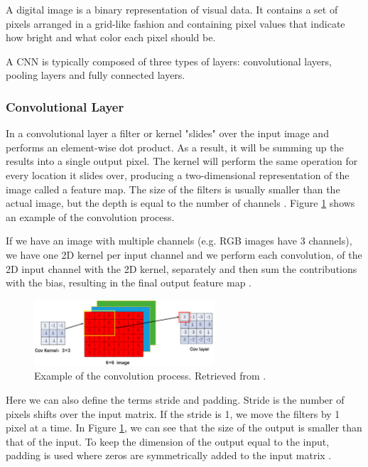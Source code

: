 A digital image is a binary representation of visual data. It contains a set of pixels arranged in a grid-like fashion and containing pixel values that indicate how bright and what color each pixel should be. 

A \ac{CNN} is typically composed of three types of layers: convolutional layers, pooling layers and fully connected layers. 

\subsubsection*{Convolutional Layer}

In a convolutional layer a filter or kernel "slides" over the input image and performs an element-wise dot product. As a result, it will be summing up the results into a single output pixel. The kernel will perform the same operation for every location it slides over, producing a two-dimensional representation of the image called a feature map. The size of the filters is usually smaller than the actual image, but the depth is equal to the number of channels \cite{2018guide}. Figure \ref{fig:convlayer} shows an example of the convolution process.

If we have an image with multiple channels (e.g. RGB images have 3 channels), we have one \ac{2D} kernel per input channel and we perform each convolution, of the \ac{2D} input channel with the \ac{2D} kernel, separately and then sum the contributions with the bias, resulting in the final output feature map \cite{2018guide}.

\begin{figure}[!htb]
  \centering
  \includegraphics[width=0.60\textwidth]{Images/convlayer.jpg}
  \caption[Example of the convolution process.]{Example of the convolution process. Retrieved from \cite{review:DL}.}
  \label{fig:convlayer}
\end{figure}

Here we can also define the terms stride and padding. Stride is the number of pixels shifts over the input matrix. If the stride is 1, we move the filters by 1 pixel at a time. In Figure \ref{fig:convlayer}, we can see that the size of the output is smaller than that of the input. To keep the dimension of the output equal to the input, padding is used where zeros are symmetrically added to the input matrix \cite{guide:cnn}.

